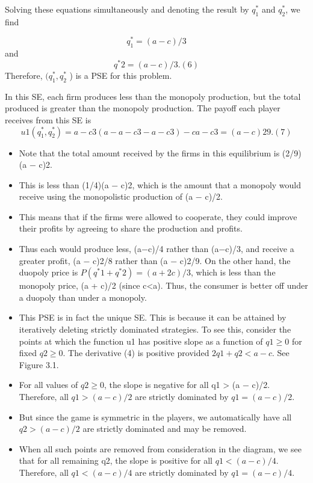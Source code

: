 \documentclass[]{article}
\begin{document}
Solving these equations simultaneously and denoting the result by $q^{\ast}_1$ and $q^{\ast}_2$, we find

\[q^{\ast}_1 = (a − c)/3\] and \[q^{\ast}
2 = (a − c)/3. (6)\]
Therefore, $(q^{\ast}_1 , q^{\ast}_2$ ) is a PSE for this problem.

In this SE, each firm produces less than the monopoly production, but the total
produced is greater than the monopoly production. The payoff each player receives from
this SE is
\[
u1(q^{\ast}_1 , q^{\ast}_2 ) = a − c
3 (a − a − c
3 − a − c
3 ) − c
a − c
3 = (a − c)2
9 . (7)\]
\begin{itemize}
    \item 

Note that the total amount received by the firms in this equilibrium is (2/9)(a − c)2.
\item 
This is less than (1/4)(a − c)2, which is the amount that a monopoly would receive using
the monopolistic production of (a − c)/2.
\item This means that if the firms were allowed to
cooperate, they could improve their profits by agreeing to share the production and profits.
    \item Thus each would produce less, (a−c)/4 rather than (a−c)/3, and receive a greater profit,
(a − c)2/8 rather than (a − c)2/9.
\itmm On the other hand, the duopoly price is $P(q^{\ast}
1 +q^{\ast}
2)=(a+2c)/3$, which is less than the
monopoly price, (a + c)/2 (since c<a). Thus, the consumer is better off under a duopoly
than under a monopoly.
\item This PSE is in fact the unique SE. This is because it can be attained by iteratively
deleting strictly dominated strategies. To see this, consider the points at which the function
u1 has positive slope as a function of $q1 \geq 0$ for fixed $q2 \geq 0$. The derivative (4) is positive
provided $2q1 + q2 < a − c$. See Figure 3.1.
\item For all values of $q2 ≥ 0$, the slope is negative for all q1 > (a − c)/2. Therefore, all
$q1 > (a − c)/2$ are strictly dominated by $q1 = (a − c)/2$.
\item But since the game is symmetric in the players, we automatically have all $q2 > (a−c)/2$
are strictly dominated and may be removed. 
\item When all such points are removed from
consideration in the diagram, we see that for all remaining q2, the slope is positive for all
$q1 < (a − c)/4$. Therefore, all $q1 < (a − c)/4$ are strictly dominated by $q1 = (a − c)/4$.
\end{itemize}
\end{document}
